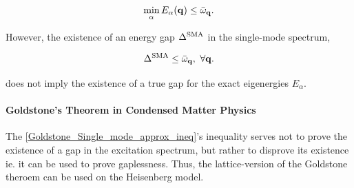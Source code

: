 \documentclass{homework}
\begin{document}
\begin{equation}
    \min_{\alpha} E_{\alpha}({\bf q}) \leq \bar{\omega}_{{\bf q}}.
    \label{Goldstone_Single_mode_approx_ineq}
\end{equation}

However, the existence of an energy gap $\Delta^{\textnormal{SMA}}$ in the single-mode spectrum,

\begin{equation}
    \Delta^{\textnormal{SMA}} \leq  \bar{\omega}_{{\bf q}}, \textnormal{ } \forall {\bf q}.
\end{equation}

does not imply the existence of a true gap for the exact eigenergies $E_{\alpha}$. \\

\clearpage

\paragraph{\textbf{Goldstone's Theorem in Condensed Matter Physics}}

The \cref{Goldstone_Single_mode_approx_ineq}'s inequality serves not to prove the existence of a gap in the excitation spectrum, but rather to disprove its existence ie. it can be used to prove gaplessness. Thus, the lattice-version of the Goldstone theroem can be used on the Heisenberg model. \\
\end{document}
